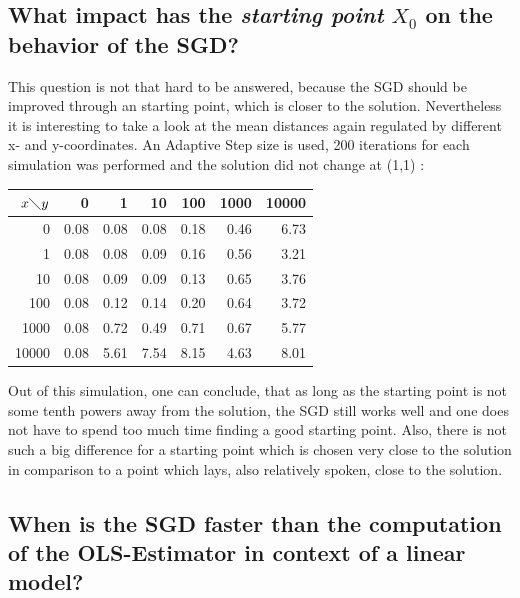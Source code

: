 \documentclass{article}
\begin{document}
\subsection{What impact has the \textit{starting point} $X_0$ on the behavior of the SGD?}
This question is not that hard to be answered, because the SGD should be improved through an starting point, which is closer to the solution. Nevertheless it is interesting to take a look at the mean distances again regulated by different x- and y-coordinates. An Adaptive Step size is used, 200 iterations for each simulation was performed and the solution did not change at (1,1) :
\begin{table}[ht]
\centering
\begin{tabular}{rrrrrrr}
  \hline
$x \diagdown y$ & 0 & 1 & 10 & 100 & 1000 & 10000 \\ 
  \hline
0 & 0.08 & 0.08 & 0.08 & 0.18 & 0.46 & 6.73 \\ 
  1 & 0.08 & 0.08 & 0.09 & 0.16 & 0.56 & 3.21 \\ 
  10 & 0.08 & 0.09 & 0.09 & 0.13 & 0.65 & 3.76 \\ 
  100 & 0.08 & 0.12 & 0.14 & 0.20 & 0.64 & 3.72 \\ 
  1000 & 0.08 & 0.72 & 0.49 & 0.71 & 0.67 & 5.77 \\ 
  10000 & 0.08 & 5.61 & 7.54 & 8.15 & 4.63 & 8.01 \\ 
   \hline
\end{tabular}
\end{table}

Out of this simulation, one can conclude, that as long as the starting point is not some tenth powers away from the solution, the SGD still works well and one does not have to spend too much time finding a good starting point. Also, there is not such a big difference for a starting point which is chosen very close to the solution in comparison to a point which lays, also relatively spoken, close to the solution.

\subsection{When is the SGD faster than the computation of the OLS-Estimator in context of a linear model?}
\end{document}
